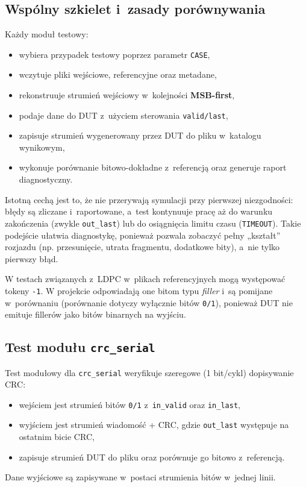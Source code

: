 \subsection{Wspólny szkielet  i~zasady porównywania}
\label{subsec:tb_common_skeleton}

Każdy moduł testowy:
\begin{itemize}
    \item wybiera przypadek testowy poprzez parametr \texttt{CASE},
    \item wczytuje pliki wejściowe, referencyjne oraz metadane,
    \item rekonstruuje strumień wejściowy w~kolejności \textbf{MSB-first},
    \item podaje dane do DUT z~użyciem sterowania \texttt{valid/last},
    \item zapisuje strumień wygenerowany przez DUT do pliku w~katalogu wynikowym,
    \item wykonuje porównanie bitowo-dokładne z~referencją oraz generuje raport diagnostyczny.
\end{itemize}

Istotną cechą  jest to, że nie przerywają symulacji przy pierwszej niezgodności:
błędy są zliczane i~raportowane, a~test kontynuuje pracę aż do warunku zakończenia (zwykle \texttt{out\_last})
lub do osiągnięcia limitu czasu (\texttt{TIMEOUT}). Takie podejście ułatwia diagnostykę, ponieważ pozwala
zobaczyć pełny „kształt” rozjazdu (np. przesunięcie, utrata fragmentu, dodatkowe bity), a~nie tylko pierwszy błąd.

W testach związanych z~LDPC w~plikach referencyjnych mogą występować tokeny \texttt{-1}.
W projekcie odpowiadają one bitom typu \emph{filler} i~są pomijane w~porównaniu (porównanie dotyczy wyłącznie bitów \texttt{0/1}),
ponieważ DUT nie emituje fillerów jako bitów binarnych na wyjściu.

\subsection{Test modułu \texttt{crc\_serial}}
\label{subsec:tb_crc_serial}

Test modułowy dla \texttt{crc\_serial} weryfikuje szeregowe (1 bit/cykl) dopisywanie CRC:
\begin{itemize}
    \item wejściem jest strumień bitów \texttt{0/1} z~\texttt{in\_valid} oraz \texttt{in\_last},
    \item wyjściem jest strumień wiadomość + CRC, gdzie \texttt{out\_last} występuje na ostatnim bicie CRC,
    \item {} zapisuje strumień DUT do pliku oraz porównuje go bitowo z~referencją.
\end{itemize}
Dane wyjściowe są zapisywane w~postaci strumienia bitów w~jednej linii.

